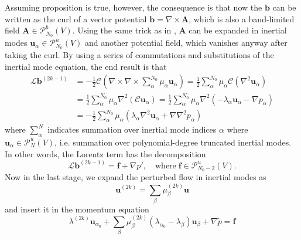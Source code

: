 Assuming proposition is true, however, the consequence is that now the $\mathbf{b}$ can be written as the curl of a vector potential $\mathbf{b} = \nabla\times \mathbf{A}$, which is also a band-limited field $\mathbf{A} \in \boldsymbol{\mathcal{P}}_{N_0}^b(V)$. Using the same trick as in \citet{ivers_enumeration_2015}, $\mathbf{A}$ can be expanded in inertial modes $\mathbf{u}_{\alpha} \in \boldsymbol{\mathcal{P}}_{N_0}^u(V)$ and another potential field, which vanishes anyway after taking the curl. By using a series of commutations and substitutions of the inertial mode equation, the end result is that 
%
\begin{equation}
\begin{aligned}
    \mathcal{L} \mathbf{b}^{(2k-1)} &= -\frac{1}{2} \mathcal{C} \left(\nabla\times \nabla\times \sum_{\alpha}^{N_0} \mu_\alpha \mathbf{u}_{\alpha}\right) = \frac{1}{2} \sum_{\alpha}^{N_0} \mu_\alpha \mathcal{C} \left(\nabla^2  \mathbf{u}_{\alpha}\right)
    \\
    &= \frac{1}{2} \sum_{\alpha}^{N_0} \mu_\alpha \nabla^2 \left(\mathcal{C} \mathbf{u}_{\alpha}\right) = \frac{1}{2} \sum_{\alpha}^{N_0} \mu_\alpha \nabla^2 \left(-\lambda_\alpha \mathbf{u}_{\alpha} - \nabla p_\alpha \right) \\ 
    &= - \frac{1}{2} \sum_{\alpha}^{N_0} \mu_\alpha \left(\lambda_\alpha \nabla^2 \mathbf{u}_{\alpha} + \nabla \nabla^2 p_\alpha \right)
\end{aligned}
\end{equation}
%
where $\sum_{\alpha}^{N}$ indicates summation over inertial mode indices $\alpha$ where $\mathbf{u}_\alpha \in \boldsymbol{\mathcal{P}}_{N}^u(V)$, i.e. summation over polynomial-degree truncated inertial modes. In other words, the Lorentz term has the decomposition
%
\begin{equation}
    \mathcal{L}\mathbf{b}^{(2k-1)} = \mathbf{f} + \nabla p',\quad \text{where} \; \mathbf{f} \in \boldsymbol{\mathcal{P}}_{N_0-2}^u(V).
\end{equation}
%
Now in the last stage, we expand the perturbed flow in inertial modes as 
%
\begin{equation}
    \mathbf{u}^{(2k)} = \sum_\beta \mu_{\beta}^{(2k)} \mathbf{u}
\end{equation}
%
and insert it in the momentum equation
%
\begin{equation}
    \lambda^{(2k)} \mathbf{u}_{\alpha_0} + \sum_\beta \mu_{\beta}^{(2k)} (\lambda_{\alpha_0} - \lambda_\beta) \mathbf{u}_{\beta} + \nabla \tilde{p} = \mathbf{f}
\end{equation}
